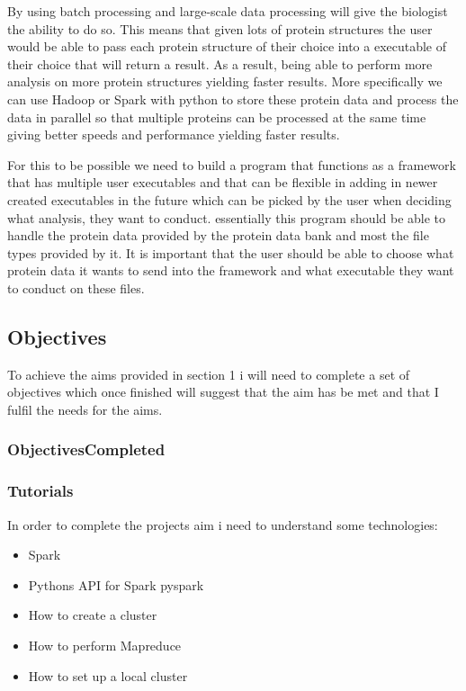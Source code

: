 \documentclass{report}
\begin{document}
By using batch processing and large-scale data processing will give the biologist the ability to do so. This means that given lots of protein structures the user would be able to pass each protein structure of their choice into a executable of their choice that will return a result. As a result, being able to perform more analysis on more protein structures yielding faster results. More specifically we can use Hadoop or Spark with python to store these protein data and process the data in parallel so that multiple proteins can be processed at the same time giving better speeds and performance yielding faster results.

For this to be possible we need to build a program that functions as a framework that has multiple user executables and that can be flexible in adding in newer created executables in the future which can be picked by the user when deciding what analysis, they want to conduct. essentially this program should be able to handle the protein data provided by the protein data bank and most the file types provided by it. It is important that the user should be able to choose what protein data it wants to send into the framework and what executable they want to conduct on these files.

\subsection{Objectives}

To achieve the aims provided in section 1 i will need to complete a set of objectives which once finished will suggest that the aim has be met and that I fulfil the needs for the aims.

\subsubsection{ObjectivesCompleted}

\subsubsection{Tutorials}

In order to complete the projects aim i need to understand some technologies:

\begin{itemize}
    \item Spark
    \item Pythons API for Spark pyspark
    \item How to create a cluster
    \item How to perform Mapreduce
    \item How to set up a local cluster
\end{itemize}
\end{document}
